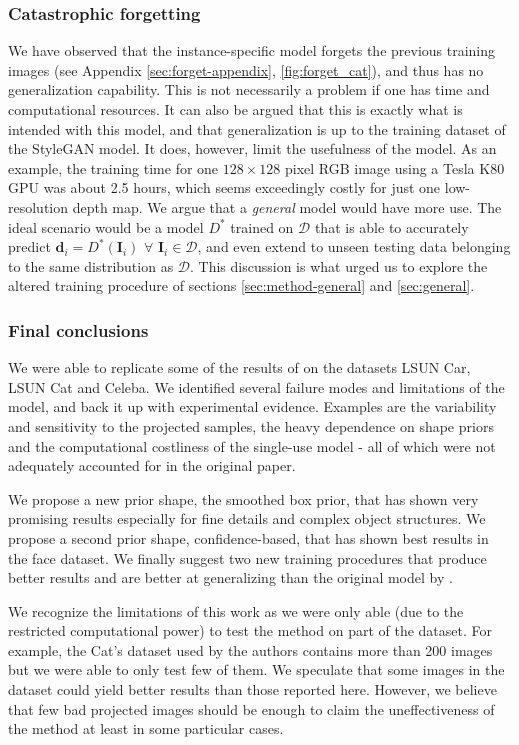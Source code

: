 \subsubsection{Catastrophic forgetting}
\label{sec:forget}
We have observed that the instance-specific model forgets the previous training images (see Appendix \ref{sec:forget-appendix}, \autoref{fig:forget_cat}), and thus has no generalization capability. This is not necessarily a problem if one has time and computational resources. It can also be argued that this is exactly what is intended with this model, and that generalization is up to the training dataset of the StyleGAN model. It does, however, limit the usefulness of the model. As an example, the training time for one $128 \times 128$ pixel RGB image using a Tesla K80 GPU was about 2.5 hours, which seems exceedingly costly for just one low-resolution depth map. We argue that a \textit{general} model would have more use. The ideal scenario would be a model $D^*$ trained on $\mathcal{D}$ that is able to accurately predict $\mathbf{d}_i = D^*(\mathbf{I}_i)$ $\forall$ $ \mathbf{I}_i \in \mathcal{D}$, and even extend to unseen testing data belonging to the same distribution as $\mathcal{D}$. This discussion is what urged us to explore the altered training procedure of sections \ref{sec:method-general} and \ref{sec:general}.

\subsubsection{Final conclusions}
We were able to replicate some of the results of \cite{gan2shape} on the datasets LSUN Car, LSUN Cat and Celeba. We identified several failure modes and limitations of the model, and back it up with experimental evidence. Examples are the variability and sensitivity to the projected samples, the heavy dependence on shape priors and the computational costliness of the single-use model - all of which were not adequately accounted for in the original paper.

We propose a new prior shape, the smoothed box prior, that has shown very promising results especially for fine details and complex object structures. We propose a second prior shape, confidence-based, that has shown best results in the face dataset. We finally suggest two new training procedures that produce better results and are better at generalizing than the original model by \cite{gan2shape}.

We recognize the limitations of this work as we were only able (due to the restricted computational power) to test the method on part of the dataset. For example, the Cat's dataset used by the authors contains more than 200 images but we were able to only test few of them. We speculate that some images in the dataset could yield better results than those reported here. However, we believe that few bad projected images should be enough to claim the uneffectiveness of the method at least in some particular cases.

